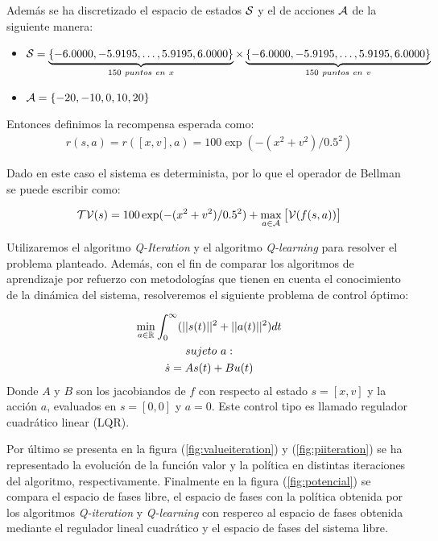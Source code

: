 \begin{example}
    Además se ha discretizado el espacio de estados $\mathcal{S}$ y el de acciones $\mathcal{A}$ de la siguiente manera: 
    \begin{itemize}
        \item $\Ss = \underbrace{\{-6.0000 , -5.9195 , \dots, 5.9195  ,  6.0000\}}_{150 \ puntos \ en \ x}\times \underbrace{\{-6.0000 , -5.9195 , \dots, 5.9195  ,  6.0000\}}_{150 \ puntos \ en \ v}$
        \item $\mathcal{A} = \{ -20 ,  -10  ,   0  ,  10   , 20\}$
    \end{itemize}

    Entonces definimos la recompensa esperada como:
    \begin{gather}
        r(s,a) = r([x,v],a) =  100 \exp(-(x^2+v^2)/0.5^2)
    \end{gather}

    Dado en este caso el sistema es determinista, por lo que el operador de Bellman se puede escribir como:

    \begin{gather}
        \mathcal{T}\mathcal{V}(s) = 100 \exp(-(x^2+v^2)/0.5^2) + \max_{a\in \mathcal{A}} \big[   \mathcal{V}(f(s,a))\big]
    \end{gather}
 
    Utilizaremos el algoritmo \emph{Q-Iteration} y el algoritmo \emph{Q-learning} para resolver el problema planteado. Además, con el fin de comparar los algoritmos de aprendizaje por refuerzo con metodologías que tienen en cuenta el conocimiento de la dinámica del sistema, resolveremos el siguiente problema de control óptimo:
    
    \begin{gather}
        \min_{a \in \mathbb{R}} \int_0^\infty (|| s(t)||^2  + ||a(t)||^2 )dt  \\
        sujeto \ a: \notag \\
        \dot{s} = As(t) + Bu(t) \notag
    \end{gather}
    Donde $A$ y $B$ son los jacobiandos de $f$ con respecto al estado $s=[x,v]$ y la acción $a$, evaluados en $s=[0,0]$ y $a=0$. Este control tipo es llamado regulador cuadrático linear (LQR).

    Por último se presenta en la figura (\ref{fig:valueiteration}) y (\ref{fig:piiteration}) se ha representado la evolución de la función valor y la política en distintas iteraciones del algoritmo, respectivamente. Finalmente en la figura (\ref{fig:potencial}) se compara el espacio de fases libre, el espacio de fases con la política obtenida por los algoritmos \emph{Q-iteration} y \emph{Q-learning} con resperco al espacio de fases obtenida mediante el regulador lineal cuadrático y el espacio de fases del sistema libre.




\end{example}
